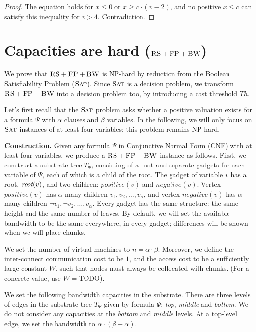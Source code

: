 \documentclass[9pt,twocolumn]{scrartcl}
\newcommand{\aroot}{\emph{root}}
\newcommand{\clauses}{\alpha}
\newcommand{\variables}{\beta}
\newcommand{\FP}{\textsc{FP}}
\newcommand{\RS}{\textsc{RS}}
\newcommand{\BW}{\textsc{BW}}
\newcommand{\Tree}{\ensuremath{T}}
\newcommand{\SAT}{\textsc{Sat}}
\newcommand{\Formula}{\ensuremath{\Psi}}
\newcommand{\Thr}{\ensuremath{Th}}
\newcommand{\positive}{\ensuremath{positive}}
\newcommand{\negative}{\ensuremath{negative}}
\begin{document}
\begin{appendix}
\begin{proof}
The equation holds for $x \leq 0$ or $x \geq c \cdot (v - 2)$,
and no
positive $x \leq c$ can satisfy this inequality for $v > 4$. Contradiction.
\end{proof}


\section{Capacities are hard ($\RS+\FP+\BW$)}

We prove that $\RS+\FP+\BW$ is NP-hard by reduction from the Boolean Satisfiability Problem ($\SAT$).
Since $\SAT$ is a decision
problem, we transform $\RS+\FP+\BW$ into a decision problem too, by
introducing a cost threshold $\Thr$.

Let's first recall that the $\SAT$ problem asks whether a positive valuation exists
for a formula $\Formula$ with $\clauses$ clauses and $\variables$ variables.
In the following, we will only focus on $\SAT$ instances of at least four variables;
this problem remains NP-hard.

\textbf{Construction.}
Given any formula $\Formula$ in Conjunctive Normal Form (CNF) with at least four variables, we produce
a $\RS+\FP+\BW$ instance as follows. First, we construct a substrate tree $\Tree_{\Formula}$, consisting of
a root and separate gadgets for each variable of $\Formula$, each of which
is a child of the root.
The gadget of variable $v$ has a root, $\aroot(v)$, and two children:
$\positive(v)$ and $\negative(v)$. Vertex $\positive(v)$ has $\clauses$
many children $v_1, v_2, \ldots, v_{\clauses}$, and vertex $\negative(v)$ has
$\clauses$ many children $\neg v_1, \neg v_2, \dots, v_{\clauses}$. Every
gadget has the same structure: the same height and the same number of
leaves. By default, we will set the available bandwidth to be the
same everywhere, in every gadget; differences will be shown when we
will place chunks.

We set the number of virtual machines to $n = \clauses \cdot \variables$.
Moreover, we define the inter-connect communication cost to be $1$,
and the access cost to be a sufficiently large constant $W$,
such that nodes must always be collocated with chunks.
(For a concrete value, use $W=$TODO).


We set the following bandwidth capacities in the substrate. There are three
levels of edges in the substrate tree $\Tree_{\Formula}$ given by formula
$\Formula$: \emph{top}, \emph{middle} and \emph{bottom}.
We do not consider any capacities at the \emph{bottom} and \emph{middle} levels.
At a top-level edge, we set the bandwidth to $\clauses \cdot (\variables -
\clauses)$.


\end{appendix}
\end{document}
